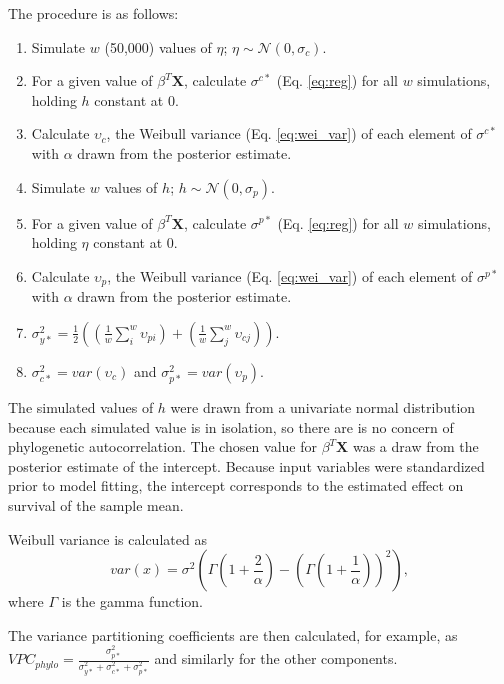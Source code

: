 \documentclass[12pt,letterpaper]{article}
\begin{document}
The procedure is as follows:
\begin{enumerate}
  \item Simulate \(w\) (50,000) values of \(\eta\); \(\eta \sim \mathcal{N}(0, \sigma_{c})\).
  \item For a given value of \(\beta^{T} \mathbf{X}\), calculate \(\sigma^{c*}\) (Eq. \ref{eq:reg}) for all \(w\) simulations, holding \(h\) constant at 0.
  \item Calculate \(\upsilon_{c}\), the Weibull variance (Eq. \ref{eq:wei_var}) of each element of \(\sigma^{c*}\) with \(\alpha\) drawn from the posterior estimate.
  \item Simulate \(w\) values of \(h\); \(h \sim \mathcal{N}(0, \sigma_{p})\). 
  \item For a given value of \(\beta^{T} \mathbf{X}\), calculate \(\sigma^{p*}\) (Eq. \ref{eq:reg}) for all \(w\) simulations, holding \(\eta\) constant at 0.
  \item Calculate \(\upsilon_{p}\), the Weibull variance (Eq. \ref{eq:wei_var}) of each element of \(\sigma^{p*}\) with \(\alpha\) drawn from the posterior estimate.
  \item \(\sigma_{y*}^{2} = \frac{1}{2} \left(\left(\frac{1}{w} \sum_{i}^{w} \upsilon_{pi}\right) + \left(\frac{1}{w} \sum_{j}^{w} \upsilon_{cj}\right)\right)\).
  \item \(\sigma_{c*}^{2} = var(\upsilon_{c})\) and \(\sigma_{p*}^{2} = var(\upsilon_{p})\).
\end{enumerate}

The simulated values of \(h\) were drawn from a univariate normal distribution because each simulated value is in isolation, so there are is no concern of phylogenetic autocorrelation. The chosen value for \(\beta^{T} \mathbf{X}\) was a draw from the posterior estimate of the intercept. Because input variables were standardized prior to model fitting, the intercept corresponds to the estimated effect on survival of the sample mean.

Weibull variance is calculated as
\begin{equation}
  var(x) = \sigma^{2}\left(\Gamma\left(1 + \frac{2}{\alpha}\right) - \left(\Gamma\left(1 + \frac{1}{\alpha}\right)\right)^{2}\right),
  \label{eq:wei_var}
\end{equation}
where \(\Gamma\) is the gamma function. 

The variance partitioning coefficients are then calculated, for example, as \(VPC_{phylo} = \frac{\sigma_{p*}^{2}}{\sigma_{y*}^{2} + \sigma_{c*}^{2} + \sigma_{p*}^{2}}\) and similarly for the other components.
\end{document}
